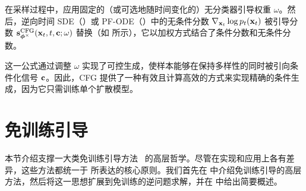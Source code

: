 在采样过程中，应用固定的（或可选地随时间变化的）无分类器引导权重 $\omega$。然后，逆向时间 SDE（）或 PF-ODE（）中的无条件分数 $\nabla_{{\mathbf{x}}_t} \log p_t({\mathbf{x}}_t)$ 被引导分数 ${\mathbf{s}}_{\bm{\phi}^\times}^{\mathrm{CFG}}({\mathbf{x}}_t ,t, {\mathbf{c}}; \omega)$ 替换（如  所示），它以加权方式结合了条件分数和无条件分数。

这一公式通过调整 $\omega$ 实现了可控生成，使样本能够在保持多样性的同时被引向条件化信号 ${\mathbf{c}}$。因此，CFG 提供了一种有效且计算高效的方式来实现精确的条件生成，因为它只需训练单个扩散模型。





\clearpage
\newpage






\section{免训练引导}
本节介绍支撑一大类免训练引导方法~\citep{chung2023diffusion,ye2024tfg,he2024manifold,bansal2023universal} 的高层哲学。尽管在实现和应用上各有差异，这些方法都统一于  所表达的核心原则。我们首先在  中介绍免训练引导的高层方法，然后将这一思想扩展到免训练的逆问题求解，并在  中给出简要概述。


